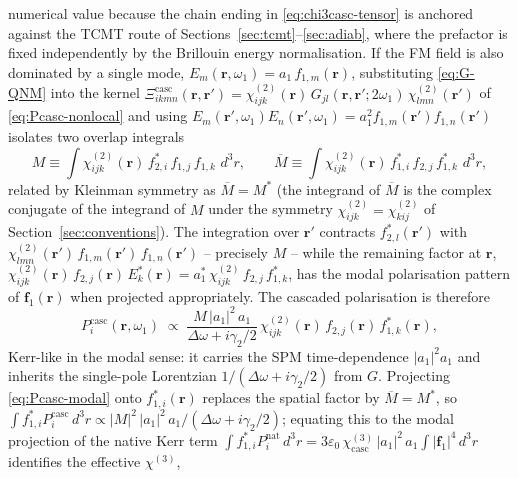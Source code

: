 \documentclass[11pt,a4paper]{article}
\newcommand{\eps}{\varepsilon}
\newcommand{\bvec}[1]{\mathbf{#1}}
\newcommand{\f}{\bvec{f}}
\newcommand{\ri}{\bvec{r}}
\newcommand{\dthreer}{\,d^{3}r}
\newcommand{\chitwo}{\chi^{(2)}}
\newcommand{\chithree}{\chi^{(3)}}
\newcommand{\Dom}{\Delta\omega}
\begin{document}
\begin{itemize}
    numerical value because the chain ending in
    \eqref{eq:chi3casc-tensor} is anchored against the TCMT route of
    Sections~\ref{sec:tcmt}--\ref{sec:adiab}, where the prefactor is
    fixed independently by the Brillouin energy normalisation.
    If the FM field is also dominated by a single mode,
    $E_m(\ri,\omega_1)=a_1\,f_{1,m}(\ri)$, substituting \eqref{eq:G-QNM}
    into the kernel
    $\Xi^{\text{casc}}_{ikmn}(\ri,\ri')=\chitwo_{ijk}(\ri)\,G_{jl}(\ri,\ri';2\omega_1)\,\chitwo_{lmn}(\ri')$
    of \eqref{eq:Pcasc-nonlocal} and using
    $E_m(\ri',\omega_1)E_n(\ri',\omega_1)=a_1^{2}f_{1,m}(\ri')f_{1,n}(\ri')$
    isolates two overlap integrals
    \begin{equation}
      M\equiv \!\int\!\chitwo_{ijk}(\ri)\,f_{2,i}^*\,f_{1,j}\,f_{1,k}\,\dthreer,
      \qquad
      \overline M\equiv \!\int\!\chitwo_{ijk}(\ri)\,f_{1,i}^*\,f_{2,j}\,f_{1,k}^*\,\dthreer,
      \label{eq:M-overline-M}
    \end{equation}
    related by Kleinman symmetry as $\overline M=M^*$ (the integrand
    of $\overline M$ is the complex conjugate of the integrand of $M$
    under the symmetry $\chitwo_{ijk}=\chitwo_{kij}$ of
    Section~\ref{sec:conventions}).  The integration over $\ri'$
    contracts $f_{2,l}^*(\ri')$ with $\chitwo_{lmn}(\ri')\,f_{1,m}(\ri')\,f_{1,n}(\ri')$
    -- precisely $M$ -- while the remaining factor at $\ri$,
    $\chitwo_{ijk}(\ri)\,f_{2,j}(\ri)\,E_k^*(\ri)=a_1^*\,\chitwo_{ijk}\,f_{2,j}\,f_{1,k}^*$,
    has the modal polarisation pattern of $\f_1(\ri)$ when projected
    appropriately.  The cascaded polarisation is therefore
    \begin{equation}
      P_i^{\text{casc}}(\ri,\omega_1)\;\propto\;
        \frac{M\,|a_1|^{2}\,a_1}{\Dom+i\gamma_2/2}\,
        \chitwo_{ijk}(\ri)\,f_{2,j}(\ri)\,f_{1,k}^{*}(\ri),
      \label{eq:Pcasc-modal}
    \end{equation}
    Kerr-like in the modal sense: it carries the SPM time-dependence
    $|a_1|^{2}a_1$ and inherits the single-pole Lorentzian
    $1/(\Dom+i\gamma_2/2)$ from $G$.  Projecting \eqref{eq:Pcasc-modal}
    onto $f_{1,i}^{*}(\ri)$ replaces the spatial factor by
    $\overline M=M^{*}$, so $\int f_{1,i}^{*}P_i^{\text{casc}}\dthreer
     \propto |M|^{2}\,|a_1|^{2}\,a_1/(\Dom+i\gamma_2/2)$; equating
    this to the modal projection of the native Kerr term
    $\int f_{1,i}^{*}P_i^{\text{nat}}\dthreer
     =3\eps_0\,\chithree_\text{casc}\,|a_1|^{2}\,a_1\!\int|\f_1|^{4}\dthreer$
    identifies the effective $\chithree$,
    \begin{equation}

\end{equation}
\end{itemize}
\end{document}
